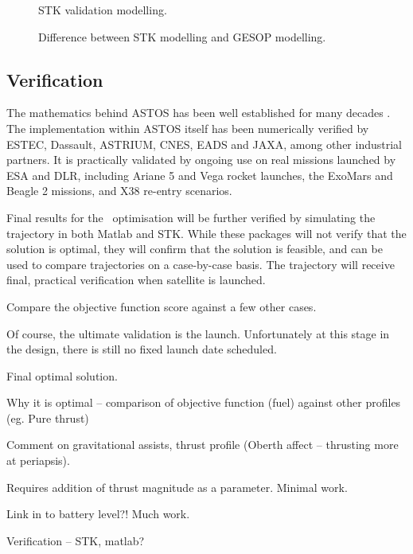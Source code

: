\begin{figure}
\centering
\caption{STK validation modelling.} \label{fig:STK-verification}
\end{figure}

\begin{figure}
\centering
\caption{Difference between STK modelling and GESOP modelling.} \label{fig:STK-error}
\end{figure}



\subsection{Verification} \label{sub:ASTOS-Verification}

The mathematics behind ASTOS has been well established for many decades \parencite{Kaplan1976}. The implementation within ASTOS itself has been numerically verified by ESTEC, Dassault, ASTRIUM, CNES, EADS and JAXA, among other industrial partners. It is practically validated by ongoing use on real missions launched by ESA and DLR, including Ariane 5 and Vega rocket launches, the ExoMars and Beagle 2 missions, and X38 re-entry scenarios.
 
Final results for the \BW\ optimisation will be further verified by simulating the trajectory in both Matlab and STK. While these packages will not verify that the solution is optimal, they will confirm that the solution is feasible, and can be used to compare trajectories on a case-by-case basis. The trajectory will receive final, practical verification when satellite is launched.

Compare the objective function score against a few other cases.

Of course, the ultimate validation is the launch. Unfortunately at this stage in the design, there is still no fixed launch date scheduled.

Final optimal solution.

Why it is optimal – comparison of objective function (fuel) against other profiles (eg. Pure thrust)

Comment on gravitational assists, thrust profile (Oberth affect – thrusting more at periapsis).

Requires addition of thrust magnitude as a parameter. Minimal work.

Link in to battery level?! Much work.

Verification – STK, matlab?


